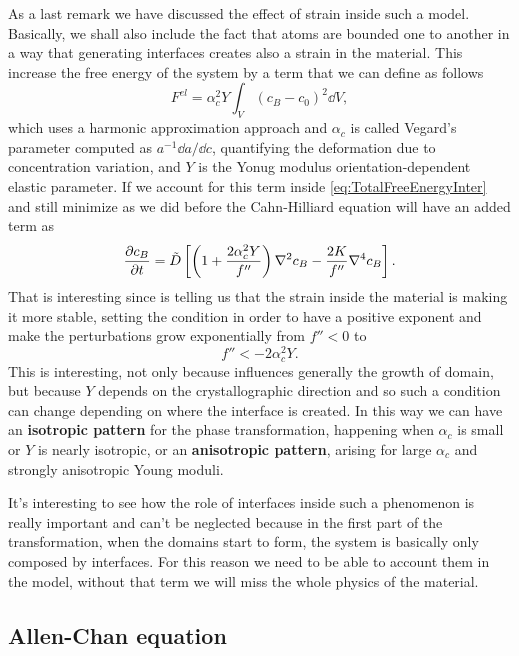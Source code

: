 As a last remark we have discussed the effect of strain inside such a model. Basically, we shall also include the fact that atoms are bounded one to another in a way that generating interfaces creates also a strain in the material. This increase the free energy of the system by a term that we can define as follows
\begin{equation}
    F^{el} = \alpha^2_c Y\int_V (c_B - c_0)^2\dd V,
\end{equation}
which uses a harmonic approximation approach and $\alpha_c$ is called Vegard's parameter computed as $a^{-1}\dd a/\dd c$, quantifying the deformation due to concentration variation, and $Y$ is the Yonug modulus orientation-dependent elastic parameter. If we account for this term inside \eqref{eq:TotalFreeEnergyInter} and still minimize as we did before the Cahn-Hilliard equation will have an added term as
\begin{equation}
    \pdv{c_B}{t} = \tilde{D}\left[ \left( 1 + \frac{2\alpha_c^2Y}{f''} \right)\laplacian c_B - \frac{2K}{f''}\nabla^4 c_B \right].
\end{equation}
That is interesting since is telling us that the strain inside the material is making it more stable, setting the condition in order to have a positive exponent and make the perturbations grow exponentially from $f'' < 0$ to
\begin{equation}
    f'' < -2\alpha_c^2Y.
\end{equation}
This is interesting, not only because influences generally the growth of domain, but because $Y$ depends on the crystallographic direction and so such a condition can change depending on where the interface is created. In this way we can have an \textbf{isotropic pattern} for the phase transformation, happening when $\alpha_c$ is small or $Y$ is nearly isotropic, or an \textbf{anisotropic pattern}, arising for large $\alpha_c$ and strongly anisotropic Young moduli.

\nt
{
    It's interesting to see how the role of interfaces inside such a phenomenon is really important and can't be neglected because in the first part of the transformation, when the domains start to form, the system is basically only composed by interfaces. For this reason we need to be able to account them in the model, without that term we will miss the whole physics of the material.
}

\subsection{Allen-Chan equation}

